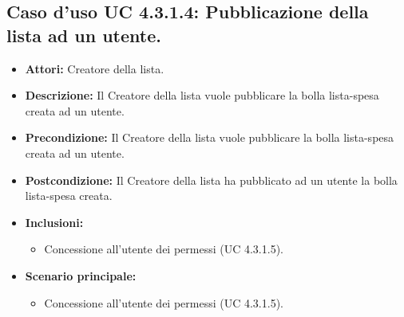 \subsection{Caso d'uso UC 4.3.1.4: Pubblicazione della lista ad un utente.}
\label{Caso d'uso UC 4.3.1.4: Pubblicazione della lista ad un utente.}

\FloatBarrier
\begin{itemize}
\item \textbf{Attori:} Creatore della lista.
\item \textbf{Descrizione:} Il Creatore della lista vuole pubblicare la bolla lista-spesa creata ad un utente.
\item \textbf{Precondizione:} Il Creatore della lista vuole pubblicare la bolla lista-spesa creata ad un utente. 
\item \textbf{Postcondizione:} Il Creatore della lista ha pubblicato ad un utente la bolla lista-spesa creata.
\item \textbf{Inclusioni:}
	\begin{itemize}
	\item{Concessione all'utente dei permessi (UC 4.3.1.5).}
	\end{itemize}
	\item \textbf{Scenario principale:}
	\begin{itemize}
	\item{Concessione all'utente dei permessi (UC 4.3.1.5).}
	\end{itemize}
\end{itemize}